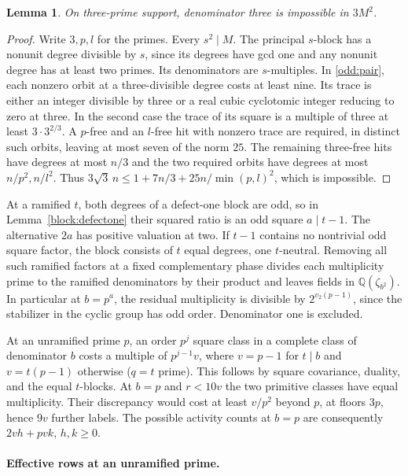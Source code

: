 \documentclass[11pt]{amsart}
\numberwithin{equation}{section}
\newtheorem{lemma}[theorem]{Lemma}
\theoremstyle{definition}
\theoremstyle{plain}
\newcommand{\QQ}{\mathbb Q}
\begin{document}
\begin{lemma}\label{odd:27}
On three-prime support, denominator three is impossible in $3M^2$.
\end{lemma}
\begin{proof}
Write $3,p,l$ for the primes. Every $s^2\mid M$. The principal $s$-block
has a nonunit degree divisible by $s$, since its degrees have gcd one
and any nonunit degree has at least two primes. Its denominators are
$s$-multiples. In \eqref{odd:pair}, each nonzero orbit at a three-divisible
degree costs at least nine. Its trace is either an integer divisible by
three or a real cubic cyclotomic integer reducing to zero at three. In
the second case the trace of its square is a multiple of three at least
$3\cdot3^{2/3}$. A $p$-free and an $l$-free hit with nonzero trace are
required, in distinct such orbits, leaving at most seven of the norm $25$.
The remaining three-free hits have degrees at most $n/3$ and the two
required orbits have degrees at most $n/p^2,n/l^2$. Thus
$3\sqrt3\,n\le1+7n/3+25n/\min(p,l)^2$, which is impossible.
\end{proof}

At a ramified $t$, both degrees of a defect-one block are odd, so in
Lemma~\ref{block:defectone} their squared ratio is an odd square $a\mid t-1$.
The alternative $2a$ has positive valuation at two. If $t-1$ contains no
nontrivial odd square factor, the block consists of $t$ equal degrees, one
$t$-neutral. Removing all such ramified factors at a fixed complementary
phase divides each multiplicity prime to the ramified denominators by their
product and leaves fields in $\QQ(\zeta_{b^2})$. In particular at $b=p^a$,
the residual multiplicity is divisible by $2^{v_2(p-1)}$, since the
stabilizer in the cyclic group has odd order. Denominator one is excluded.

At an unramified prime $p$, an order $p^j$ square class in a complete class
of denominator $b$ costs a multiple of $p^{j-1}v$, where $v=p-1$ for
$t\mid b$ and $v=t(p-1)$ otherwise ($q=t$ prime). This follows by square
covariance, duality, and the equal $t$-blocks. At $b=p$ and $r<10v$ the two
primitive classes have equal multiplicity. Their discrepancy would cost at
least $v/p^2$ beyond $p$, at floors $3p$, hence $9v$ further labels. The
possible activity counts at $b=p$ are consequently $2vh+pvk$, $h,k\ge0$.

\paragraph{Effective rows at an unramified prime.}
\end{document}
